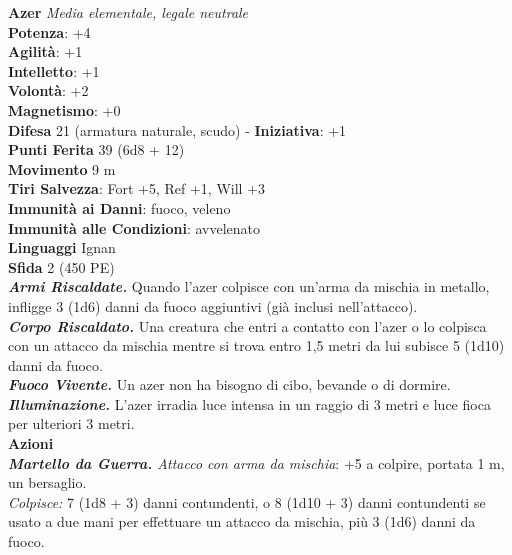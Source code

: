 \begin{multicols}{2}
\medskip\textbf{Azer}
\emph{Media elementale, legale neutrale}\\
\textbf{Potenza}: +4\\
\textbf{Agilità}: +1\\
\textbf{Intelletto}: +1\\
\textbf{Volontà}: +2\\
\textbf{Magnetismo}: +0\\
\textbf{Difesa} 21 (armatura naturale, scudo) - \textbf{Iniziativa}: +1\\
\textbf{Punti Ferita} 39 (6d8 + 12)\\
\textbf{Movimento} 9 m\\
\textbf{Tiri Salvezza}: Fort +5, Ref +1, Will +3\\
\textbf{Immunità ai Danni}: fuoco, veleno\\
\textbf{Immunità alle Condizioni}: avvelenato\\
\textbf{Linguaggi} Ignan\\
\textbf{Sfida} 2 (450 PE)\smallskip\\
\emph{\textbf{Armi Riscaldate.}} Quando l'azer colpisce con un'arma da mischia in metallo, infligge 3 (1d6) danni da fuoco aggiuntivi (già inclusi nell'attacco).\\
\emph{\textbf{Corpo Riscaldato.}} Una creatura che entri a contatto con l'azer o lo colpisca con un attacco da mischia mentre si trova entro 1,5 metri da lui subisce 5 (1d10) danni da fuoco.\\
\emph{\textbf{Fuoco Vivente.}} Un azer non ha bisogno di cibo, bevande o di dormire.\\
\emph{\textbf{Illuminazione.}} L'azer irradia luce intensa in un raggio di 3 metri e luce fioca per ulteriori 3 metri.\\
\smallskip\textbf{Azioni}\\
\emph{\textbf{Martello da Guerra.} Attacco con arma da mischia}: +5 a colpire, portata 1 m, un bersaglio.\\
\emph{Colpisce:} 7 (1d8 + 3) danni contundenti, o 8 (1d10 + 3) danni contundenti se usato a due mani per effettuare un attacco da mischia, più 3 (1d6) danni da fuoco.\\


\end{multicols}
